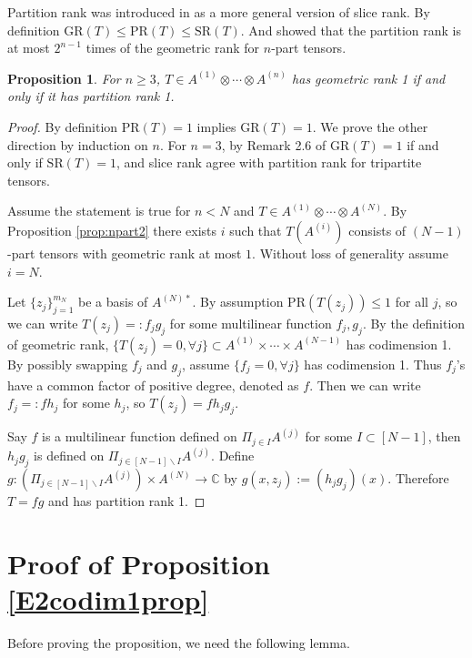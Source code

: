 \documentclass[10pt]{article} %
\newcommand{\GR}{\mathrm{GR}}
\newcommand{\SR}{\mathrm{SR}}
\newtheorem{prop}[thm]{Proposition}
\theoremstyle{definition}
\begin{document}
Partition rank was introduced in \cite{partition} as a more general version of slice rank. By definition $\GR(T)\leq\mathrm{PR}(T)\leq \SR(T)$. And \cite{CM21} showed that the partition rank is at most $2^{n-1}$ times of the geometric rank for $n$-part tensors.

\begin{prop}\label{prop:npart3}
For $n\geq 3$, $T\in A^{(1)}\otimes\cdots\otimes A^{(n)}$ has geometric rank 1 if and only if it has partition rank 1.
\end{prop}

\begin{proof}
By definition $\mathrm{PR}(T)=1$ implies $\GR(T)=1$. We prove the other direction by induction on $n$. For $n=3$, by Remark 2.6 of \cite{GL20} $\GR(T)=1$ if and only if $\SR(T)=1$,  and slice rank agree with partition rank for tripartite tensors.

Assume the statement is true for $n<N$ and $T\in A^{(1)}\otimes\cdots\otimes A^{(N)}$. By Proposition \ref{prop:npart2} there exists $i$ such that $T(A^{(i)})$ consists of $(N-1)$-part tensors with geometric rank at most $1$. Without loss of generality assume $i=N$.

Let $\{z_j\}_{j=1}^{m_N}$ be a basis of $A^{(N)*}$. By assumption $\mathrm{PR}(T(z_j))\leq 1$ for all $j$, so we can write $T(z_j)=:f_jg_j$ for some multilinear function $f_j,g_j$. By the definition of geometric rank, $\{T(z_j)=0,\forall j\}\subset A^{(1)}\times\cdots\times A^{(N-1)}$ has codimension 1. By possibly swapping $f_j$ and $g_j$, assume $\{f_j=0,\forall j\}$ has codimension 1. Thus $f_j$'s have a common factor of positive degree, denoted as $f$. Then we can write $f_j=:fh_j$ for some $h_j$, so $T(z_j)=fh_jg_j$. 

Say $f$ is a multilinear function defined on $\Pi_{j\in I}A^{(j)}$ for some $I\subset [N-1]$, then $h_jg_j$ is defined on $\Pi_{j\in [N-1]\backslash I}A^{(j)}$. Define $g:(\Pi_{j\in [N-1]\backslash I}A^{(j)})\times A^{(N)}\rightarrow \mathbb{C}$ by $g(x,z_j):=(h_jg_j)(x)$. Therefore $T=fg$ and has partition rank 1.
\end{proof}



\section{Proof of Proposition \ref{E2codim1prop}}\label{sectionofproof}
Before proving the proposition, we need the following lemma.
\end{document}
